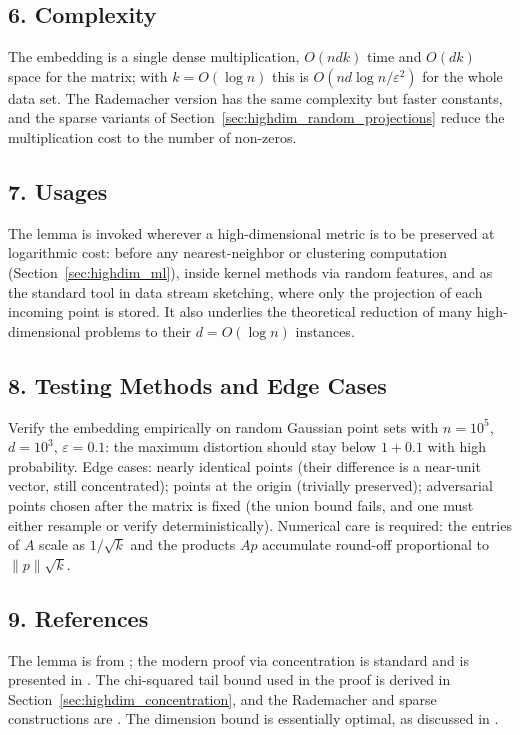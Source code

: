 \subsection{6. Complexity}

The embedding is a single dense multiplication, $O(n d k)$ time and $O(dk)$
space for the matrix; with $k = O(\log n)$ this is $O(n d \log n / \varepsilon^2)$
for the whole data set. The Rademacher version has the same complexity but
faster constants, and the sparse variants of
Section~\ref{sec:highdim_random_projections} reduce the multiplication cost to
the number of non-zeros.

\subsection{7. Usages}

The lemma is invoked wherever a high-dimensional metric is to be preserved at
logarithmic cost: before any nearest-neighbor or clustering computation
(Section~\ref{sec:highdim_ml}), inside kernel methods via random features, and
as the standard tool in data stream sketching, where only the projection of
each incoming point is stored. It also underlies the theoretical reduction of
many high-dimensional problems to their $d = O(\log n)$ instances.

\subsection{8. Testing Methods and Edge Cases}

Verify the embedding empirically on random Gaussian point sets with
$n = 10^5$, $d = 10^3$, $\varepsilon = 0.1$: the maximum distortion should
stay below $1 + 0.1$ with high probability. Edge cases: nearly identical
points (their difference is a near-unit vector, still concentrated); points at
the origin (trivially preserved); adversarial points chosen after the matrix
is fixed (the union bound fails, and one must either resample or verify
deterministically). Numerical care is required: the entries of $A$ scale as
$1/\sqrt{k}$ and the products $A p$ accumulate round-off proportional to
$\|p\| \sqrt{k}$.

\subsection{9. References}

The lemma is from \cite{johnson1984}; the modern proof via concentration is
standard and is presented in \cite{matousek2002}. The chi-squared tail bound
used in the proof is derived in Section~\ref{sec:highdim_concentration}, and
the Rademacher and sparse constructions are \cite{achlioptas2003}. The
dimension bound is essentially optimal, as discussed in
\cite{matousek2002}.

